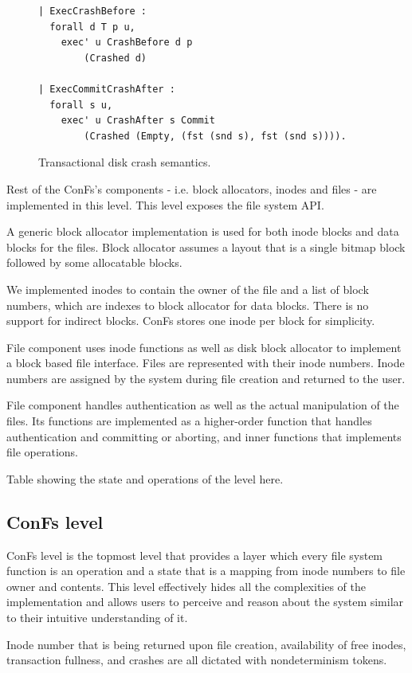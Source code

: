 \begin{figure}[H]
    \centering
\begin{verbatim}
| ExecCrashBefore :
  forall d T p u,
    exec' u CrashBefore d p 
        (Crashed d)

| ExecCommitCrashAfter :
  forall s u,
    exec' u CrashAfter s Commit 
        (Crashed (Empty, (fst (snd s), fst (snd s)))).
\end{verbatim}
    \caption{Transactional disk crash semantics.}
    \label{fig:TD_Crash_Semantics}
\end{figure}

Rest of the ConFs's components - i.e. block allocators, inodes and files - are implemented in this level. This level exposes the file system API.

A generic block allocator implementation is used for both inode blocks and data blocks for the files. Block allocator assumes a layout that is a single bitmap block followed by some allocatable blocks.

We implemented inodes to contain the owner of the file and a list of block numbers, which are indexes to block allocator for data blocks. There is no support for indirect blocks. ConFs stores one inode per block for simplicity.

File component uses inode functions as well as disk block allocator to implement a block based file interface. Files are represented with their inode numbers. Inode numbers are assigned by the system during file creation and returned to the user.

File component handles authentication as well as the actual manipulation of the files. Its functions are implemented as a higher-order function that handles authentication and committing or aborting, and inner functions that implements file operations.

{\color{red} Table showing the state and operations of the level here}.

\subsection{ConFs level}
ConFs level is the topmost level that provides a layer which every file system function is an operation and a state that is a mapping from inode numbers to file owner and contents. This level effectively hides all the complexities of the implementation and allows users to perceive and reason about the system similar to their intuitive understanding of it.

Inode number that is being returned upon file creation, availability of free inodes, transaction fullness, and crashes are all dictated with nondeterminism tokens.

